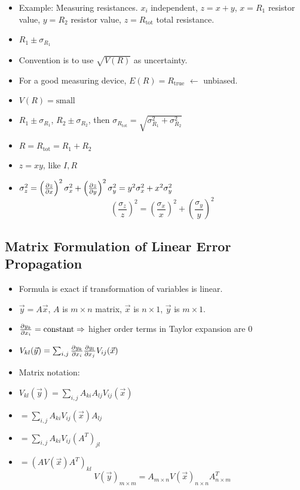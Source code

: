 \begin{itemize}
    \item Example: Measuring resistances. $x_i$ independent, $z = x + y$, $x=R_1$ resistor value, $y=R_2$ resistor value, $z=R_{\text{tot}}$ total resistance.
    \item $R_1 \pm \sigma_{R_1}$
    \item Convention is to use $\sqrt{V(R)}$ as uncertainty.
    \item For a good measuring device, $E(R) = R_{\text{true}}$ $\leftarrow$ unbiased.
    \item $V(R) = \text{small}$
    \item $R_1 \pm \sigma_{R_1}$, $R_2 \pm \sigma_{R_2}$, then $\sigma_{R_{\text{tot}}} = \sqrt{\sigma_{R_1}^2 + \sigma_{R_2}^2}$
    \item $R = R_{\text{tot}} = R_1 + R_2$
    \item $z = xy$, like $I, R$
    \item $\sigma_z^2 = \left(\pdv{z}{x} \right)^2 \sigma_x^2 + \left(\pdv{z}{y} \right)^2 \sigma_y^2 = y^2 \sigma_x^2 + x^2 \sigma_y^2$
          \[ \boxed{ \left(\frac{\sigma_z}{z} \right)^2 = \left(\frac{\sigma_x}{x} \right)^2 + \left(\frac{\sigma_y}{y} \right)^2 } \]
\end{itemize}

\subsection{Matrix Formulation of Linear Error Propagation}

\begin{itemize}
    \item Formula is exact if transformation of variables is linear.
    \item $\vec{y} = A \vec{x}$, $A$ is $m \times n$ matrix, $\vec{x}$ is $n \times 1$, $\vec{y}$ is $m \times 1$.
    \item $\pdv{y_k}{x_i} = \text{constant} \Rightarrow$ higher order terms in Taylor expansion are $0$
    \item $V_{kl}(\vec{y}) = \sum_{i,j} \pdv{y_k}{x_i} \pdv{y_l}{x_j} V_{ij}(\vec{x})$
    \item Matrix notation:
    \item $V_{kl}(\vec{y})  = \sum_{i,j} A_{ki} A_{lj} V_{ij}(\vec{x})$
    \item $ = \sum_{i,j} A_{ki} V_{ij}(\vec{x}) A_{lj}$
    \item $ = \sum_{i,j} A_{ki} V_{ij} (A^T)_{jl}$
    \item $ = (A V(\vec{x}) A^T)_{kl}$
          \[ \boxed{ V(\vec{y})_{m \times m} = A_{m \times n} V(\vec{x})_{n \times n} A^T_{n \times m} } \]
\end{itemize}

